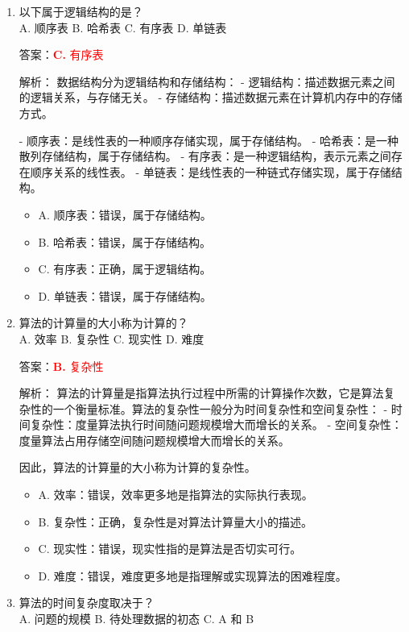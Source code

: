 \documentclass[lang=cn,newtx,10pt,scheme=chinese]{../../../elegantbook}
\begin{document}
\begin{enumerate}
    \item 以下属于逻辑结构的是？\\
    A. 顺序表 \quad B. 哈希表 \quad C. 有序表 \quad D. 单链表

    答案：\textcolor{red}{\textbf{C.} 有序表}

    解析：
    数据结构分为逻辑结构和存储结构：
    - 逻辑结构：描述数据元素之间的逻辑关系，与存储无关。
    - 存储结构：描述数据元素在计算机内存中的存储方式。
    
    - 顺序表：是线性表的一种顺序存储实现，属于存储结构。
    - 哈希表：是一种散列存储结构，属于存储结构。
    - 有序表：是一种逻辑结构，表示元素之间存在顺序关系的线性表。
    - 单链表：是线性表的一种链式存储实现，属于存储结构。

    \begin{itemize}
        \item A. 顺序表：错误，属于存储结构。
        \item B. 哈希表：错误，属于存储结构。
        \item C. 有序表：正确，属于逻辑结构。
        \item D. 单链表：错误，属于存储结构。
    \end{itemize}

    \item 算法的计算量的大小称为计算的？\\
    A. 效率 \quad B. 复杂性 \quad C. 现实性 \quad D. 难度

    答案：\textcolor{red}{\textbf{B.} 复杂性}

    解析：
    算法的计算量是指算法执行过程中所需的计算操作次数，它是算法复杂性的一个衡量标准。算法的复杂性一般分为时间复杂性和空间复杂性：
    - 时间复杂性：度量算法执行时间随问题规模增大而增长的关系。
    - 空间复杂性：度量算法占用存储空间随问题规模增大而增长的关系。
    
    因此，算法的计算量的大小称为计算的复杂性。

    \begin{itemize}
        \item A. 效率：错误，效率更多地是指算法的实际执行表现。
        \item B. 复杂性：正确，复杂性是对算法计算量大小的描述。
        \item C. 现实性：错误，现实性指的是算法是否切实可行。
        \item D. 难度：错误，难度更多地是指理解或实现算法的困难程度。
    \end{itemize}

    \item 算法的时间复杂度取决于？\\
    A. 问题的规模 \quad B. 待处理数据的初态 \quad C. A 和 B


\end{enumerate}
\end{document}
